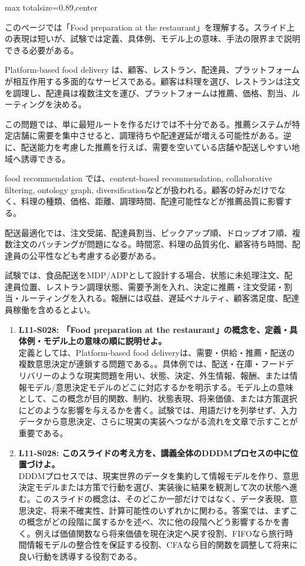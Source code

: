 \begin{minipage}[t]{0.58\textwidth}
\begin{adjustbox}{max totalsize={\textwidth}{0.89\textheight},center}
\begin{minipage}{\textwidth}\scriptsize
{}このページでは「Food preparation at the restaurant」を理解する。スライド上の表現は短いが、試験では定義、具体例、モデル上の意味、手法の限界まで説明できる必要がある。\par
Platform-based food delivery は、顧客、レストラン、配達員、プラットフォームが相互作用する多面的なサービスである。顧客は料理を選び、レストランは注文を調理し、配達員は複数注文を運び、プラットフォームは推薦、価格、割当、ルーティングを決める。\par
この問題では、単に最短ルートを作るだけでは不十分である。推薦システムが特定店舗に需要を集中させると、調理待ちや配達遅延が増える可能性がある。逆に、配送能力を考慮した推薦を行えば、需要を空いている店舗や配送しやすい地域へ誘導できる。\par
food recommendation では、content-based recommendation, collaborative filtering, ontology graph, diversificationなどが扱われる。顧客の好みだけでなく、料理の種類、価格、距離、調理時間、配達可能性などが推薦品質に影響する。\par
配送最適化では、注文受諾、配達員割当、ピックアップ順、ドロップオフ順、複数注文のバッチングが問題になる。時間窓、料理の品質劣化、顧客待ち時間、配達員の公平性なども考慮する必要がある。\par
試験では、食品配送をMDP/ADPとして設計する場合、状態に未処理注文、配達員位置、レストラン調理状態、需要予測を入れ、決定に推薦・注文受諾・割当・ルーティングを入れる。報酬には収益、遅延ペナルティ、顧客満足度、配達員稼働を含めるとよい。\par{}\begin{enumerate}\item \textbf{L11-S028: 「Food preparation at the restaurant」の概念を、定義・具体例・モデル上の意味の順に説明せよ。}\\定義としては、Platform-based food deliveryは、需要・供給・推薦・配送の複数意思決定が連鎖する問題である。。具体例では、配送・在庫・フードデリバリーのような現実問題を用い、状態、決定、外生情報、報酬、または情報モデル/意思決定モデルのどこに対応するかを明示する。モデル上の意味として、この概念が目的関数、制約、状態表現、将来価値、または方策選択にどのような影響を与えるかを書く。試験では、用語だけを列挙せず、入力データから意思決定、さらに現実の実装へつながる流れを文章で示すことが重要である。\item \textbf{L11-S028: このスライドの考え方を、講義全体のDDDMプロセスの中に位置づけよ。}\\DDDMプロセスでは、現実世界のデータを集約して情報モデルを作り、意思決定モデルまたは方策で行動を選び、実装後に結果を観測して次の状態へ進む。このスライドの概念は、そのどこか一部だけではなく、データ表現、意思決定、将来不確実性、計算可能性のいずれかに関わる。答案では、まずこの概念がどの段階に属するかを述べ、次に他の段階へどう影響するかを書く。例えば価値関数なら将来価値を現在決定へ戻す役割、FIFOなら旅行時間情報モデルの整合性を保証する役割、CFAなら目的関数を調整して将来に良い行動を誘導する役割である。\end{enumerate}

\end{minipage}
\end{adjustbox}
\end{minipage}
